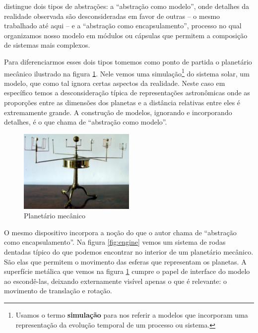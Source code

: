  distingue dois tipos de abstrações: a ``abstração como modelo'', onde detalhes da realidade observada são desconsideradas em favor de outras -- o mesmo trabalhado até aqui -- e a ``abstração como encapsulamento'', processo no qual organizamos nosso modelo em módulos ou cápsulas que permitem a composição de sistemas mais complexos. 



Para diferenciarmos esses dois tipos tomemos como ponto de partida o planetário mecânico ilustrado na figura \ref{fig:planetario}. Nele vemos uma simulação\footnote{Usamos o termo \textbf{simulação} para nos referir a modelos que incorporam uma representação da evolução temporal de um processo ou sistema.} do sistema solar, um modelo, que como tal ignora certas aspectos da realidade. Neste caso em específico temos a desconsideração típica de representações astronômicas onde as proporções entre as dimensões dos planetas e a distância relativas entre eles é extremamente grande. A construção de modelos, ignorando e incorporando detalhes, é o que  chama de ``abstração como modelo''. 

\begin{figure}[htb]
	\caption{Planetário mecânico}\label{fig:planetario}
	\begin{center}
		\includegraphics[width=0.50\textwidth]{imagens/planetario}
	\end{center}
\end{figure}

O mesmo dispositivo incorpora a noção do que o autor chama de ``abstração como encapsulamento''. Na figura \ref{fig:engine} vemos um sistema de rodas dentadas típico do que podemos encontrar no interior de um planetário mecânico. São elas que permitem o movimento das esferas que representam os planetas. A superfície metálica que vemos na figura \ref{fig:planetario} cumpre o papel de interface do modelo ao escondê-las, deixando externamente visível apenas o que é relevante: o movimento de translação e rotação. 

